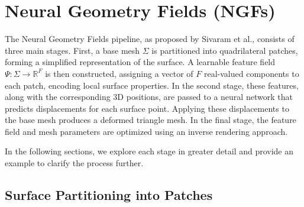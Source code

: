 \section{Neural Geometry Fields (NGFs)}\label{Sec:MainPart}

The Neural Geometry Fields pipeline, as proposed by Sivaram et al., consists of three main stages.  
First, a base mesh $\Sigma$ is partitioned into quadrilateral patches, forming a simplified representation of the surface.  
A learnable feature field $\Psi: \Sigma \rightarrow \mathbb{R}^F$ is then constructed, assigning a vector of $F$ real-valued components to each patch, encoding local surface properties.  
In the second stage, these features, along with the corresponding 3D positions, are passed to a neural network that predicts displacements for each surface point.  
Applying these displacements to the base mesh produces a deformed triangle mesh.  
In the final stage, the feature field and mesh parameters are optimized using an inverse rendering approach.  

In the following sections, we explore each stage in greater detail and provide an example to clarify the process further.  

\subsection{Surface Partitioning into Patches}

